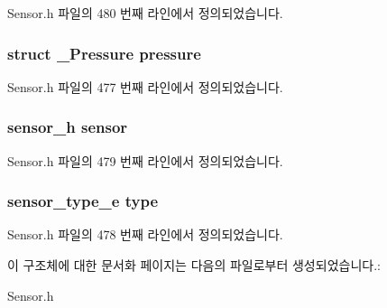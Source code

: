 Sensor.\-h 파일의 480 번째 라인에서 정의되었습니다.

\hypertarget{struct___pressure_extend_a9dba4e614ab2adf5a3ffa8d5bb899412}{
\subsubsection[{pressure}]{\setlength{\rightskip}{0pt plus 5cm}struct {\bf \-\_\-\-Pressure} pressure}}\label{struct___pressure_extend_a9dba4e614ab2adf5a3ffa8d5bb899412}


Sensor.\-h 파일의 477 번째 라인에서 정의되었습니다.

\hypertarget{struct___pressure_extend_a5bae9b7801bc3808411925cde81d3f26}{
\subsubsection[{sensor}]{\setlength{\rightskip}{0pt plus 5cm}sensor\-\_\-h sensor}}\label{struct___pressure_extend_a5bae9b7801bc3808411925cde81d3f26}


Sensor.\-h 파일의 479 번째 라인에서 정의되었습니다.

\hypertarget{struct___pressure_extend_abffb09766da2fc510a79bb51f82a36e1}{
\subsubsection[{type}]{\setlength{\rightskip}{0pt plus 5cm}sensor\-\_\-type\-\_\-e type}}\label{struct___pressure_extend_abffb09766da2fc510a79bb51f82a36e1}


Sensor.\-h 파일의 478 번째 라인에서 정의되었습니다.



이 구조체에 대한 문서화 페이지는 다음의 파일로부터 생성되었습니다.\-:\begin{DoxyCompactItemize}
\item 
Sensor.\-h\end{DoxyCompactItemize}
